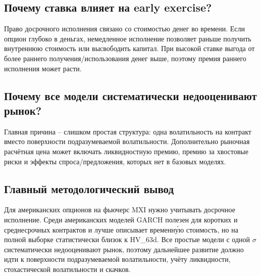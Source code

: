 \documentclass[11pt,a4paper]{article}
\begin{document}
\subsection*{Почему ставка влияет на early exercise?}

Право досрочного исполнения связано со стоимостью денег во времени. Если опцион глубоко в деньгах, немедленное исполнение позволяет раньше получить внутреннюю стоимость или высвободить капитал. При высокой ставке выгода от более раннего получения/использования денег выше, поэтому премия раннего исполнения может расти.

\subsection*{Почему все модели систематически недооценивают рынок?}

Главная причина -- слишком простая структура: одна волатильность на контракт вместо поверхности подразумеваемой волатильности. Дополнительно рыночная расчётная цена может включать ликвидностную премию, премию за хвостовые риски и эффекты спроса/предложения, которых нет в базовых моделях.

\subsection*{Главный методологический вывод}

Для американских опционов на фьючерс MXI нужно учитывать досрочное исполнение. Среди американских моделей GARCH полезен для коротких и среднесрочных контрактов и лучше описывает временну́ю стоимость, но на полной выборке статистически близок к HV\_63d. Все простые модели с одной $\sigma$ систематически недооценивают рынок, поэтому дальнейшее развитие должно идти к поверхности подразумеваемой волатильности, учёту ликвидности, стохастической волатильности и скачков.
\end{document}
